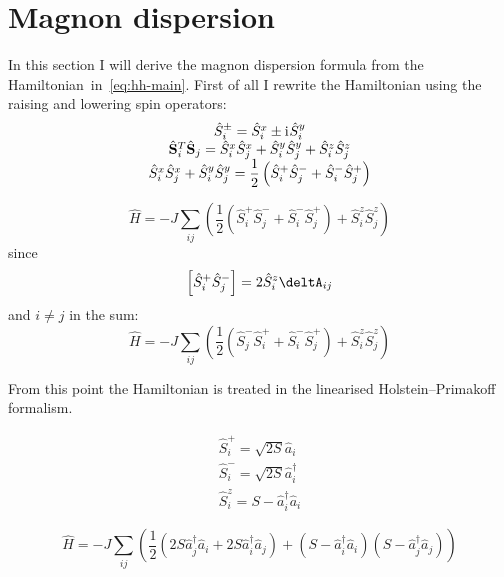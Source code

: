 \documentclass[a4paper,12pt]{article}
\newcommand{\iu}{\mathrm{i}\mkern1mu}
\begin{document}
\section{Magnon dispersion}

In this section I will derive the magnon dispersion formula from the Hamiltonian~in~\eqref{eq:hh-main}.
First of all I rewrite the Hamiltonian using the raising and lowering spin operators:
\begin{equation}
    \begin{matrix}
        \hat{S}_i^{\pm} = \hat{S}_i^x \pm \iu \hat{S}_i^y \\
        \hat{\mathbf{S}}_i^T \hat{\mathbf{S}}_j = \hat{S}_i^x \hat{S}_j^x + \hat{S}_i^y \hat{S}_j^y + \hat{S}_i^z \hat{S}_j^z \\
        \hat{S}_i^x \hat{S}_j^x + \hat{S}_i^y \hat{S}_j^y = \dfrac{1}{2}\left(
            \hat{S}_i^+\hat{S}_j^- + \hat{S}_i^-\hat{S}_j^+
        \right)
    \end{matrix}
\end{equation}

\begin{equation}
    \hat{H} = -J \sum_{ij} \left(\dfrac{1}{2}\left(
        \hat{S}_i^+\hat{S}_j^- + \hat{S}_i^-\hat{S}_j^+\right) + \hat{S}_i^z \hat{S}_j^z\right)
\end{equation}
since
\begin{equation}
    \left[\hat{S}_i^+\hat{S}_j^-\right] = 2\hat{S}_i^z\deltA_{ij}
\end{equation}
and $i\ne j$ in the sum:
\begin{equation}
    \hat{H} =-J \sum_{ij} \left(\dfrac{1}{2}\left(
            \hat{S}_j^-\hat{S}_i^+ + \hat{S}_i^-\hat{S}_j^+\right) + \hat{S}_i^z \hat{S}_j^z\right)
\end{equation}

From this point the Hamiltonian is treated in the linearised Holstein–Primakoff formalism.

\begin{equation}
    \begin{matrix}
        \hat{S}_i^+ = \sqrt{2S}\hat{a}_i \\
        \hat{S}_i^- = \sqrt{2S}\hat{a}_i^{\dag} \\
        \hat{S}_i^z = S - \hat{a}_i^{\dag}\hat{a}_i
    \end{matrix}
\end{equation}

\begin{equation}
    \hat{H} = -J \sum_{ij} \left(\dfrac{1}{2}\left(
        2S\hat{a}_j^{\dag}\hat{a}_i + 2S\hat{a}_i^{\dag}\hat{a}_j\right) + 
        \left(S - \hat{a}_i^{\dag}\hat{a}_i\right)\left(S - \hat{a}_j^{\dag}\hat{a}_j\right)\right)
\end{equation}
\end{document}
